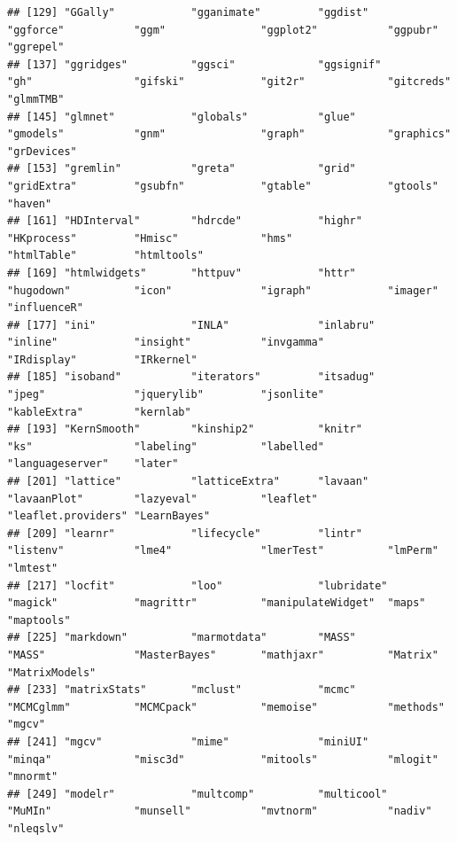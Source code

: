 \documentclass[
  12pt,
]{book}
\begin{document}
\begin{verbatim}
## [129] "GGally"            "gganimate"         "ggdist"            "ggforce"           "ggm"               "ggplot2"           "ggpubr"            "ggrepel"          
## [137] "ggridges"          "ggsci"             "ggsignif"          "gh"                "gifski"            "git2r"             "gitcreds"          "glmmTMB"          
## [145] "glmnet"            "globals"           "glue"              "gmodels"           "gnm"               "graph"             "graphics"          "grDevices"        
## [153] "gremlin"           "greta"             "grid"              "gridExtra"         "gsubfn"            "gtable"            "gtools"            "haven"            
## [161] "HDInterval"        "hdrcde"            "highr"             "HKprocess"         "Hmisc"             "hms"               "htmlTable"         "htmltools"        
## [169] "htmlwidgets"       "httpuv"            "httr"              "hugodown"          "icon"              "igraph"            "imager"            "influenceR"       
## [177] "ini"               "INLA"              "inlabru"           "inline"            "insight"           "invgamma"          "IRdisplay"         "IRkernel"         
## [185] "isoband"           "iterators"         "itsadug"           "jpeg"              "jquerylib"         "jsonlite"          "kableExtra"        "kernlab"          
## [193] "KernSmooth"        "kinship2"          "knitr"             "ks"                "labeling"          "labelled"          "languageserver"    "later"            
## [201] "lattice"           "latticeExtra"      "lavaan"            "lavaanPlot"        "lazyeval"          "leaflet"           "leaflet.providers" "LearnBayes"       
## [209] "learnr"            "lifecycle"         "lintr"             "listenv"           "lme4"              "lmerTest"          "lmPerm"            "lmtest"           
## [217] "locfit"            "loo"               "lubridate"         "magick"            "magrittr"          "manipulateWidget"  "maps"              "maptools"         
## [225] "markdown"          "marmotdata"        "MASS"              "MASS"              "MasterBayes"       "mathjaxr"          "Matrix"            "MatrixModels"     
## [233] "matrixStats"       "mclust"            "mcmc"              "MCMCglmm"          "MCMCpack"          "memoise"           "methods"           "mgcv"             
## [241] "mgcv"              "mime"              "miniUI"            "minqa"             "misc3d"            "mitools"           "mlogit"            "mnormt"           
## [249] "modelr"            "multcomp"          "multicool"         "MuMIn"             "munsell"           "mvtnorm"           "nadiv"             "nleqslv"          

\end{verbatim}
\end{document}
